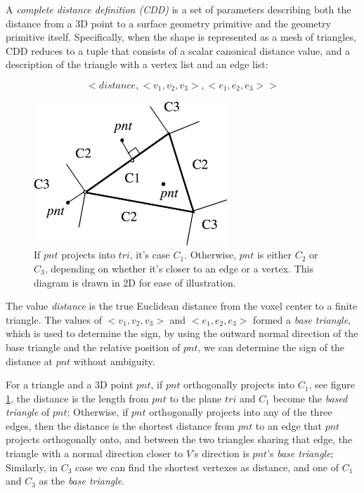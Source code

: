 A \textit{complete distance definition (CDD)} is a set of parameters describing both the distance from a 3D point to a surface geometry primitive and the geometry primitive itself. Specifically, when the shape is represented as a mesh of triangles, CDD reduces to a tuple that consists of a scalar canonical distance value, and a description of the triangle with a vertex list and an edge list:

\begin{equation}
	<distance, <v_{1},v_{2},v_{3}>, <e_{1},e_{2},e_{3}>>
\end{equation}

\begin{figure}
\sidecaption
	\includegraphics[width=0.65\textwidth]{graphics/df/complete-distance-definition}
	\caption{If $pnt$ projects into $tri$, it's case $C_{1}$. Otherwise, $pnt$ is either $C_{2}$ or $C_{3}$, depending on whether it's closer to an edge or a vertex. This diagram is drawn in 2D for ease of illustration.}
	\label{f:complete-distance-definition}
\end{figure}

The value \textit{distance} is the true Euclidean distance from the voxel center to a finite triangle. The values of $<v_{1},v_{2},v_{3}>$ and $<e_{1},e_{2},e_{3}>$ formed a \textit{base triangle}, which is used to determine the sign, by using the outward normal direction of the base triangle and the relative position of $pnt$, we can determine the sign of the distance at $pnt$ without ambiguity.

For a triangle and a 3D point $pnt$, if $pnt$ orthogonally projects into $C_{1}$, see figure \ref{f:complete-distance-definition}, the distance is the length from $pnt$ to the plane $tri$ and $C_{1}$ become the \textit{based triangle} of $pnt$; Otherwise, if $pnt$ orthogonally projects into any of the three edges, then the distance is the shortest distance from $pnt$ to an edge that $pnt$ projects orthogonally onto, and between the two triangles sharing that edge, the triangle with a normal direction closer to $V$'s direction is $pnt$'s \textit{base triangle}; Similarly, in $C_{3}$ case we can find the shortest vertexes as distance, and one of $C_{1}$ and $C_{3}$ as the \textit{base triangle}.

